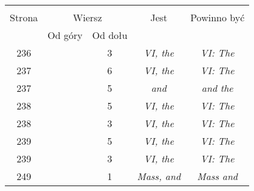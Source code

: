 \documentclass[a4paper,11pt]{article}
\begin{document}
\begin{center}
  \begin{tabular}{|c|c|c|c|c|}
    \hline
    & \multicolumn{2}{c|}{} & & \\
    Strona & \multicolumn{2}{c|}{Wiersz} & Jest
                              & Powinno być \\ \cline{2-3}
    & Od góry & Od dołu & & \\
    \hline
    236 & &  3 & \emph{VI, the} & \emph{VI: The} \\
    237 & &  6 & \emph{VI, the} & \emph{VI: The} \\
    237 & &  5 & \emph{and} & \emph{and the} \\
    238 & &  5 & \emph{VI, the} & \emph{VI: The} \\
    238 & &  3 & \emph{VI, the} & \emph{VI: The} \\
    239 & &  5 & \emph{VI, the} & \emph{VI: The} \\
    239 & &  3 & \emph{VI, the} & \emph{VI: The} \\
    249 & &  1 & \emph{Mass, and} & \emph{Mass and} \\
    \hline
  \end{tabular}


\end{center}
\end{document}
